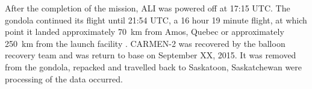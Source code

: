 After the completion of the mission, ALI was powered off at 17:15 UTC. The gondola continued its flight until 21:54 UTC, a 16 hour 19 minute flight, at which point it landed approximately 70~km from Amos, Quebec or approximately 250~km from the launch facility . CARMEN-2 was recovered by the balloon recovery team and was return to base on September XX, 2015. It was removed from the gondola, repacked and travelled back to Saskatoon, Saskatchewan were processing of the data occurred. 
